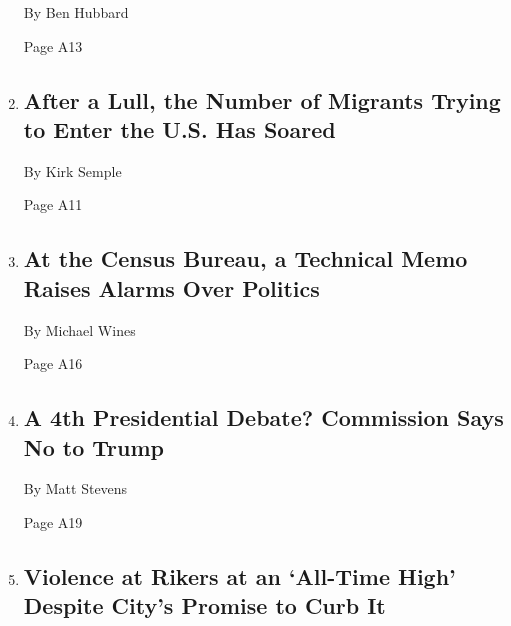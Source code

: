 \begin{enumerate}
  By Ben Hubbard

  Page A13
\item
  \href{/2020/08/06/world/americas/mexico-immigration-usa.html}{}

  \hypertarget{after-a-lull-the-number-of-migrants-trying-to-enter-the-us-has-soared}{%
  \subsection{After a Lull, the Number of Migrants Trying to Enter the
  U.S. Has
  Soared}\label{after-a-lull-the-number-of-migrants-trying-to-enter-the-us-has-soared}}

  By Kirk Semple

  Page A11
\item
  \href{/2020/08/06/us/2020-census-undocumented-immigrants.html}{}

  \hypertarget{at-the-census-bureau-a-technical-memo-raises-alarms-over-politics}{%
  \subsection{At the Census Bureau, a Technical Memo Raises Alarms Over
  Politics}\label{at-the-census-bureau-a-technical-memo-raises-alarms-over-politics}}

  By Michael Wines

  Page A16
\item
  \href{/2020/08/06/us/politics/presidential-debates-trump-biden.html}{}

  \hypertarget{a-4th-presidential-debate-commission-says-no-to-trump}{%
  \subsection{A 4th Presidential Debate? Commission Says No to
  Trump}\label{a-4th-presidential-debate-commission-says-no-to-trump}}

  By Matt Stevens

  Page A19
\item
  \href{/2020/08/06/nyregion/rikers-island-violence-guards.html}{}

  \hypertarget{violence-at-rikers-at-an-all-time-high-despite-citys-promise-to-curb-it}{%
  \subsection{Violence at Rikers at an `All-Time High' Despite City's
  Promise to Curb
  It}\label{violence-at-rikers-at-an-all-time-high-despite-citys-promise-to-curb-it}}


\end{enumerate}
